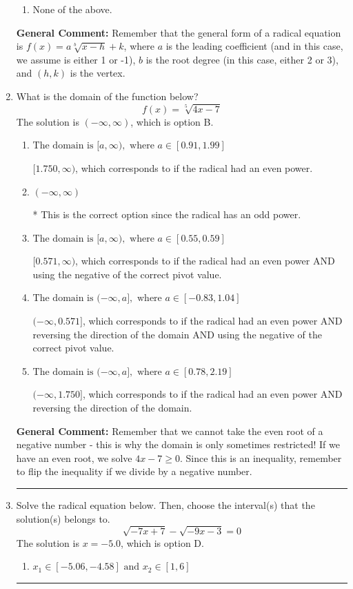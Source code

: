 \documentclass{extbook}[14pt]
\newcommand{\litem}[1]{\item #1

\rule{\textwidth}{0.4pt}}
\begin{document}
\begin{enumerate}
{\begin{enumerate}[label=\Alph*.]
\item None of the above.\end{enumerate}
\textbf{General Comment:} Remember that the general form of a radical equation is $ f(x) = a \sqrt[b]{x - h} + k $, where $a$ is the leading coefficient (and in this case, we assume is either 1 or -1), $b$ is the root degree (in this case, either 2 or 3), and $(h, k)$ is the vertex.
}
\litem{
What is the domain of the function below?
\[ f(x) = \sqrt[5]{4 x - 7} \]
The solution is \( (-\infty, \infty) \), which is option B.\begin{enumerate}[label=\Alph*.]
\item \( \text{The domain is } [a, \infty), \text{   where } a \in [0.91, 1.99] \)

$[1.750, \infty)$, which corresponds to if the radical had an even power.
\item \( (-\infty, \infty) \)

* This is the correct option since the radical has an odd power.
\item \( \text{The domain is } [a, \infty), \text{   where } a \in [0.55, 0.59] \)

$[0.571, \infty)$, which corresponds to if the radical had an even power AND using the negative of the correct pivot value.
\item \( \text{The domain is } (-\infty, a], \text{   where } a \in [-0.83, 1.04] \)

$(-\infty, 0.571]$, which corresponds to if the radical had an even power AND reversing the direction of the domain AND using the negative of the correct pivot value.
\item \( \text{The domain is } (-\infty, a], \text{   where } a \in [0.78, 2.19] \)

$(-\infty, 1.750]$, which corresponds to if the radical had an even power AND reversing the direction of the domain.
\end{enumerate}

\textbf{General Comment:} Remember that we cannot take the even root of a negative number - this is why the domain is only sometimes restricted! If we have an even root, we solve $4 x - 7 \geq 0$. Since this is an inequality, remember to flip the inequality if we divide by a negative number.
}
\litem{
Solve the radical equation below. Then, choose the interval(s) that the solution(s) belongs to.
\[ \sqrt{-7 x + 7} - \sqrt{-9 x - 3} = 0 \]
The solution is \( x = -5.0 \), which is option D.\begin{enumerate}[label=\Alph*.]
\item \( x_1 \in [-5.06, -4.58] \text{ and } x_2 \in [1,6] \)


\end{enumerate}}
\end{enumerate}
\end{document}
